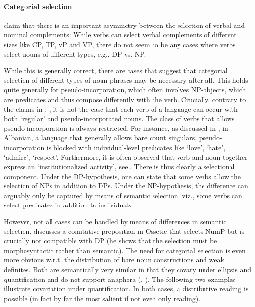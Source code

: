 \documentclass[output=paper,colorlinks,citecolor=black,
]{langscibook}
\begin{document}
\paragraph{Categorial selection} 
\label{salzmann:sec-categorial-selection}

 \citet[6]{Bruening-et-al:2018:Selection-Idioms-NP} claim that there is an important asymmetry between the selection of verbal and nominal complements: While verbs can select verbal complements of different sizes like CP, TP, vP and VP, there do not seem to be any cases where verbs select nouns of different types, e.g., DP vs. NP. 
 
 While this is generally correct, there are cases that suggest that categorial selection of different types of noun phrases may be necessary after all. This holds quite generally for pseudo-incorporation, which often involves NP-objects, which are predicates and thus compose differently with the verb. Crucially, contrary to the claims in \citet{Bruening-et-al:2018:Selection-Idioms-NP}; \citet{Bruening:2020:NP-DP}, it is not the case that each verb of a language can occur with both `regular' and pseudo-incorporated nouns. The class of verbs that allows pseudo-incorporation is always restricted. For instance, as discussed in \citet{Kallulli:1999:Dissertation-Albanian}, in Albanian, a language that generally allows bare count singulars, pseudo-incorporation is blocked with individual-level predicates like `love', `hate', `admire', `respect'. Furthermore,  it is often observed that verb and noun together express an `institutionalized activity', see \citet[164-165]{Dayal:2011:HindiPsuedoIncor}. There is thus clearly a selectional component.  Under the DP-hypothesis, one can state that some verbs allow the selection of NPs in addition to DPs. Under the NP-hypothesis, the difference can arguably only be captured by means of semantic selection, viz., some verbs can select predicates in addition to individuals.

However, not all cases can be handled by means of differences in semantic selection. \citet{Erschler:2019:DP-Ossetic} discusses a comitative preposition in Ossetic that selects NumP but is crucially not compatible with DP (he shows that the selection must be morphosyntactic rather than semantic). The need for categorial selection is even more obvious w.r.t. the distribution of bare noun constructions and weak definites. Both are semantically very similar in that they covary under ellipsis and quantification and do not support anaphora (\citealt{Carlson-et-al:2006:WeakDefinites}, \citealt{Aguilar:2014:WeakDefinites}). The following two examples illustrate covariation under quantification. In both cases, a distributive reading is possible (in fact by far the most salient if not even only reading).
\end{document}
